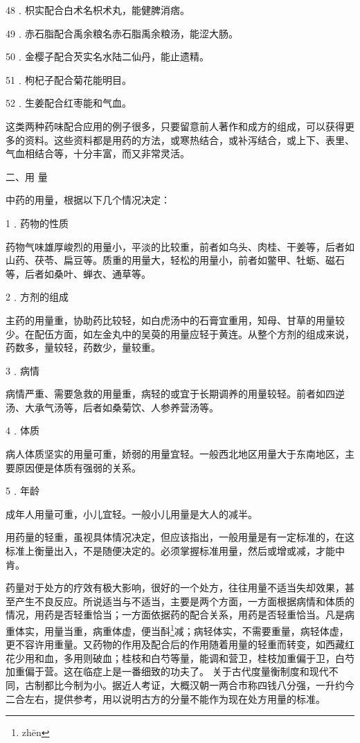 \documentclass[a4paper,12pt,UTF8,twoside]{ctexbook}
\begin{document}
48﹒枳实配合白术名枳术丸，能健脾消痞。

49﹒赤石脂配合禹余粮名赤石脂禹余粮汤，能涩大肠。

50﹒金樱子配合芡实名水陆二仙丹，能止遗精。

51﹒枸杞子配合菊花能明目。

52﹒生姜配合红枣能和气血。

这类两种药味配合应用的例子很多，只要留意前人著作和成方的组成，可以获得更多的资料。这些资料都是用药的方法，或寒热结合，或补泻结合，或上下、表里、气血相结合等，十分丰富，而又非常灵活。

二、用 量

中药的用量，根据以下几个情况决定：

1﹒药物的性质

药物气味雄厚峻烈的用量小，平淡的比较重，前者如乌头、肉桂、干姜等，后者如山药、茯苓、扁豆等。质重的用量大，轻松的用量小，前者如鳖甲、牡蛎、磁石等，后者如桑叶、蝉衣、通草等。

2﹒方剂的组成

主药的用量重，协助药比较轻，如白虎汤中的石膏宜重用，知母、甘草的用量较少。在配伍方面，如左金丸中的吴萸的用量应轻于黄连。从整个方剂的组成来说，药数多，量较轻，药数少，量较重。

3﹒病情

病情严重、需要急救的用量重，病轻的或宜于长期调养的用量较轻。前者如四逆汤、大承气汤等，后者如桑菊饮、人参养营汤等。

4﹒体质

病人体质坚实的用量可重，娇弱的用量宜轻。一般西北地区用量大于东南地区，主要原因便是体质有强弱的关系。

5﹒年龄

成年人用量可重，小儿宜轻。一般小儿用量是大人的减半。

用药量的轻重，虽视具体情况决定，但应该指出，一般用量是有一定标准的，在这标准上衡量出入，不是随便决定的。必须掌握标准用量，然后或增或减，才能中肯。

药量对于处方的疗效有极大影响，很好的一个处方，往往用量不适当失却效果，甚至产生不良反应。所说适当与不适当，主要是两个方面，一方面根据病情和体质的情况，用药是否轻重恰当；一方面依据药的配合关系，用药是否轻重恰当。凡是病重体实，用量当重，病重体虚，便当酙\footnote{zh\=en}减；病轻体实，不需要重量，病轻体虚，更不容许用重量。又药物的作用及配合后的作用随着用量的轻重而转变，如西藏红花少用和血，多用则破血；桂枝和白芍等量，能调和营卫，桂枝加重偏于卫，白芍加重偏于营。这在临症上是一番细致的功夫了。
关于古代度量衡制度和现代不同，古制都比今制为小。据近人考证，大概汉朝一两合市称四钱八分强，一升约今二合左右，提供参考，用以说明古方的分量不能作为现在处方用量的标准。
\end{document}
